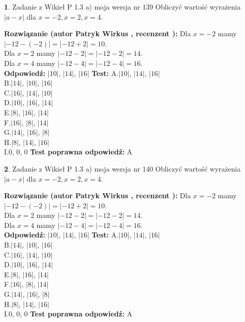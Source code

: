 \documentclass[12pt, a4paper]{article}
\theoremstyle{definition} %
\newtheorem{zad}{}
\newcommand{\zadStart}[1]{\begin{zad}#1\newline}
\newcommand{\zadStop}{\end{zad}}
\newcommand{\rozwStart}[2]{\noindent \textbf{Rozwiązanie (autor #1 , recenzent #2): }\newline}
\newcommand{\rozwStop}{\newline}
\newcommand{\odpStart}{\noindent \textbf{Odpowiedź:}\newline}
\newcommand{\odpStop}{\newline}
\newcommand{\testStart}{\noindent \textbf{Test:}\newline}
\newcommand{\testStop}{\newline}
\newcommand{\kluczStart}{\noindent \textbf{Test poprawna odpowiedź:}\newline}
\newcommand{\kluczStop}{\newline}
\begin{document}
\zadStart{Zadanie z Wikieł P 1.3 a) moja wersja nr 139}
Obliczyć wartość wyrażenia $|a - x|$ dla $x=-2,x=2,x=4$.
\zadStop
\rozwStart{Patryk Wirkus}{}
Dla $x = -2$ mamy $|-12 - (-2)| = |-12 + 2| = 10$.\\
Dla $x = 2$ mamy $|-12 - 2| = |-12 - 2| = 14$.\\
Dla $x = 4$ mamy $|-12 - 4| = |-12 - 4| = 16$.\\
\rozwStop
\odpStart
$|10|$, $|14|$, $|16|$
\odpStop
\testStart
A.$|10|$, $|14|$, $|16|$\\
B.$|14|$, $|10|$, $|16|$\\
C.$|16|$, $|14|$, $|10|$\\
D.$|10|$, $|16|$, $|14|$\\
E.$|8|$, $|16|$, $|14|$\\
F.$|16|$, $|8|$, $|14|$\\
G.$|14|$, $|16|$, $|8|$\\
H.$|8|$, $|14|$, $|16|$\\
I.$0$, $0$, $0$
\testStop
\kluczStart
A
\kluczStop



\zadStart{Zadanie z Wikieł P 1.3 a) moja wersja nr 140}
Obliczyć wartość wyrażenia $|a - x|$ dla $x=-2,x=2,x=4$.
\zadStop
\rozwStart{Patryk Wirkus}{}
Dla $x = -2$ mamy $|-12 - (-2)| = |-12 + 2| = 10$.\\
Dla $x = 2$ mamy $|-12 - 2| = |-12 - 2| = 14$.\\
Dla $x = 4$ mamy $|-12 - 4| = |-12 - 4| = 16$.\\
\rozwStop
\odpStart
$|10|$, $|14|$, $|16|$
\odpStop
\testStart
A.$|10|$, $|14|$, $|16|$\\
B.$|14|$, $|10|$, $|16|$\\
C.$|16|$, $|14|$, $|10|$\\
D.$|10|$, $|16|$, $|14|$\\
E.$|8|$, $|16|$, $|14|$\\
F.$|16|$, $|8|$, $|14|$\\
G.$|14|$, $|16|$, $|8|$\\
H.$|8|$, $|14|$, $|16|$\\
I.$0$, $0$, $0$
\testStop
\kluczStart
A
\kluczStop
\end{document}
